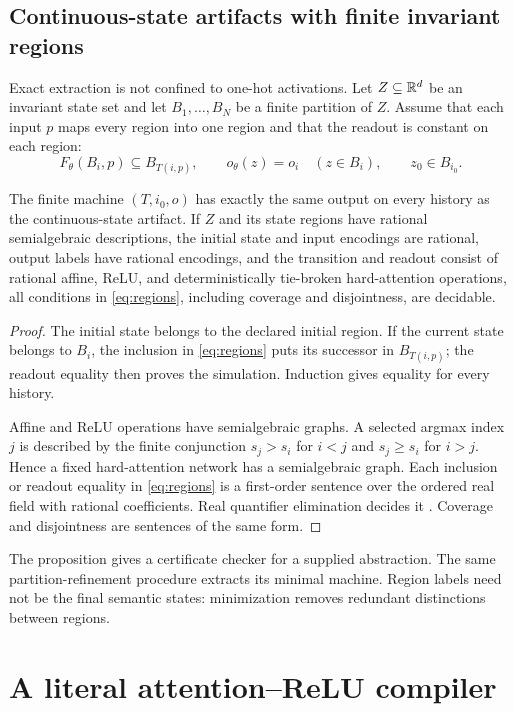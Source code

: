 \subsection{Continuous-state artifacts with finite invariant regions}
Exact extraction is not confined to one-hot activations. Let $Z\subseteq\mathbb R^d$ be an invariant state set and let $B_1,\ldots,B_N$ be a finite partition of $Z$. Assume that each input $p$ maps every region into one region and that the readout is constant on each region:
\begin{equation}
 F_\theta(B_i,p)\subseteq B_{T(i,p)},\qquad
 o_\theta(z)=o_i\quad(z\in B_i),\qquad z_0\in B_{i_0}.
 \label{eq:regions}
\end{equation}
\begin{proposition}\label{prop:regions}
The finite machine $(T,i_0,o)$ has exactly the same output on every history as the continuous-state artifact. If $Z$ and its state regions have rational semialgebraic descriptions, the initial state and input encodings are rational, output labels have rational encodings, and the transition and readout consist of rational affine, ReLU, and deterministically tie-broken hard-attention operations, all conditions in \eqref{eq:regions}, including coverage and disjointness, are decidable.
\end{proposition}
\begin{proof}
The initial state belongs to the declared initial region. If the current state belongs to $B_i$, the inclusion in \eqref{eq:regions} puts its successor in $B_{T(i,p)}$; the readout equality then proves the simulation. Induction gives equality for every history.

Affine and ReLU operations have semialgebraic graphs. A selected argmax index $j$ is described by the finite conjunction $s_j>s_i$ for $i<j$ and $s_j\ge s_i$ for $i>j$. Hence a fixed hard-attention network has a semialgebraic graph. Each inclusion or readout equality in \eqref{eq:regions} is a first-order sentence over the ordered real field with rational coefficients. Real quantifier elimination decides it \citep{basu2006}. Coverage and disjointness are sentences of the same form.
\end{proof}
The proposition gives a certificate checker for a supplied abstraction. The same partition-refinement procedure extracts its minimal machine. Region labels need not be the final semantic states: minimization removes redundant distinctions between regions.

\section{A literal attention--ReLU compiler}\label{app:compiler}
